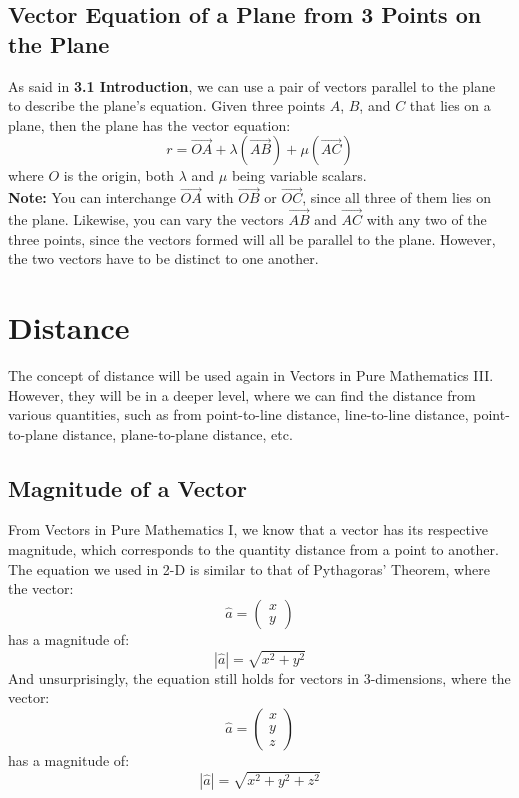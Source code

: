 \documentclass[hidelinks, a4paper, 12pt]{article}
\newcommand{\bd}{\textbf}
\newcommand{\n}{\\[\baselineskip]}
\begin{document}
        \subsection{Vector Equation of a Plane from 3 Points on the Plane}
            As said in \bd{3.1 Introduction}, we can use a pair of vectors parallel to the plane to describe the plane's equation. Given three points $A$, $B$,
            and $C$ that lies on a plane, then the plane has the vector equation:
            \[r = \vec{OA} + \lambda (\vec{AB}) + \mu (\vec{AC})\]
            where $O$ is the origin, both $\lambda$ and $\mu$ being variable scalars.\n
            \bd{Note: }You can interchange $\vec{OA}$ with $\vec{OB}$ or $\vec{OC}$, since all three of them lies on the plane.
            Likewise, you can vary the vectors $\vec{AB}$ and $\vec{AC}$ with any two of the three points, since the vectors formed will all be parallel to the plane. However,
            the two vectors have to be distinct to one another.

    \section{Distance}
        The concept of distance will be used again in Vectors in Pure Mathematics III. However, they will be in a deeper level, where we can find the distance from various
        quantities, such as from point-to-line distance, line-to-line distance, point-to-plane distance, plane-to-plane distance, etc.
        \subsection{Magnitude of a Vector}
            From Vectors in Pure Mathematics I, we know that a vector has its respective magnitude, which corresponds to the quantity distance from a point to another.
            The equation we used in 2-D is similar to that of Pythagoras' Theorem, where the vector:
            \[\hat{a} = \begin{pmatrix} x \\ y \end{pmatrix}\]
            has a magnitude of:
            \[|\hat{a}| = \sqrt{x^2 + y^2}\]
            And unsurprisingly, the equation still holds for vectors in 3-dimensions, where the vector:
            \[\hat{a} = \begin{pmatrix} x \\ y \\ z \end{pmatrix}\]
            has a magnitude of:
            \[|\hat{a}| = \sqrt{x^2 + y^2 + z^2}\]
\end{document}
